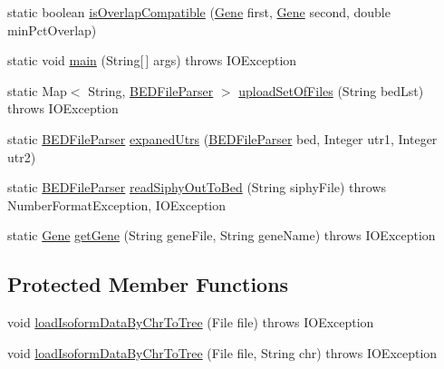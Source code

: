 \begin{DoxyCompactItemize}
\item 
static boolean \hyperlink{classbroad_1_1pda_1_1annotation_1_1_b_e_d_file_parser_a80bdec41f0a829196cee03fc498b6eb3}{is\+Overlap\+Compatible} (\hyperlink{classumms_1_1core_1_1annotation_1_1_gene}{Gene} first, \hyperlink{classumms_1_1core_1_1annotation_1_1_gene}{Gene} second, double min\+Pct\+Overlap)
\item 
static void \hyperlink{classbroad_1_1pda_1_1annotation_1_1_b_e_d_file_parser_a378ef26bd5ca3d6e143774ca50a9df9a}{main} (String\mbox{[}$\,$\mbox{]} args)  throws I\+O\+Exception
\item 
static Map$<$ String, \hyperlink{classbroad_1_1pda_1_1annotation_1_1_b_e_d_file_parser}{B\+E\+D\+File\+Parser} $>$ \hyperlink{classbroad_1_1pda_1_1annotation_1_1_b_e_d_file_parser_a67089f9c331c88c265b2497e00570838}{upload\+Set\+Of\+Files} (String bed\+Lst)  throws I\+O\+Exception 
\item 
static \hyperlink{classbroad_1_1pda_1_1annotation_1_1_b_e_d_file_parser}{B\+E\+D\+File\+Parser} \hyperlink{classbroad_1_1pda_1_1annotation_1_1_b_e_d_file_parser_aeb7ff6d87763c08b8fd2ea26ccdec9b4}{expaned\+Utrs} (\hyperlink{classbroad_1_1pda_1_1annotation_1_1_b_e_d_file_parser}{B\+E\+D\+File\+Parser} bed, Integer utr1, Integer utr2)
\item 
static \hyperlink{classbroad_1_1pda_1_1annotation_1_1_b_e_d_file_parser}{B\+E\+D\+File\+Parser} \hyperlink{classbroad_1_1pda_1_1annotation_1_1_b_e_d_file_parser_abd360124c8927f470f35d09beed22cbe}{read\+Siphy\+Out\+To\+Bed} (String siphy\+File)  throws Number\+Format\+Exception, I\+O\+Exception 
\item 
static \hyperlink{classumms_1_1core_1_1annotation_1_1_gene}{Gene} \hyperlink{classbroad_1_1pda_1_1annotation_1_1_b_e_d_file_parser_a37e961395720da4c91b43ae3d09fc467}{get\+Gene} (String gene\+File, String gene\+Name)  throws I\+O\+Exception 
\end{DoxyCompactItemize}
\subsection*{Protected Member Functions}
\begin{DoxyCompactItemize}
\item 
void \hyperlink{classbroad_1_1pda_1_1annotation_1_1_b_e_d_file_parser_a2fef87f60d9c9b5744c720de07b548db}{load\+Isoform\+Data\+By\+Chr\+To\+Tree} (File file)  throws I\+O\+Exception
\item 
void \hyperlink{classbroad_1_1pda_1_1annotation_1_1_b_e_d_file_parser_a1d3697e1837ea59dcf9e90e1fbfac887}{load\+Isoform\+Data\+By\+Chr\+To\+Tree} (File file, String chr)  throws I\+O\+Exception 
\end{DoxyCompactItemize}



